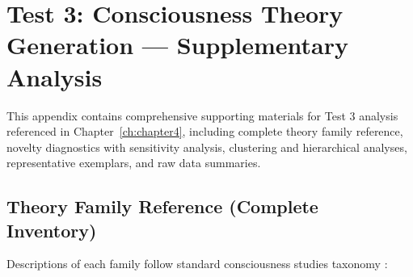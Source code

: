 \section{Test 3: Consciousness Theory Generation --- Supplementary Analysis}
\label{sec:t3_appendix}

This appendix contains comprehensive supporting materials for Test 3 analysis referenced in Chapter~\ref{ch:chapter4}, including complete theory family reference, novelty diagnostics with sensitivity analysis, clustering and hierarchical analyses, representative exemplars, and raw data summaries.

\subsection{Theory Family Reference (Complete Inventory)}
\label{sec:t3_theory_families}



Descriptions of each family follow standard consciousness studies taxonomy \citep[]{chalmers1996conscious, koch2004physical, tononi2016integrated}:

